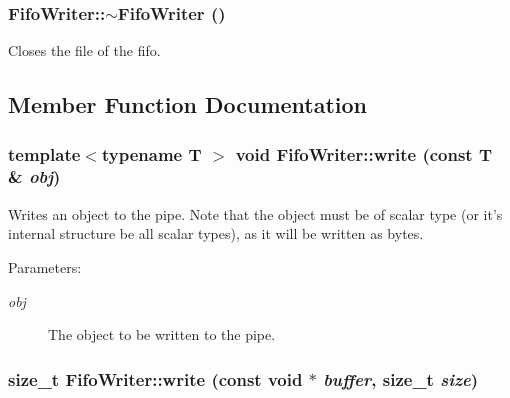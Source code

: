 \hypertarget{classFifoWriter_06e6742e763b0fff527c9144798a6bc7}{
\subsubsection[{$\sim$FifoWriter}]{\setlength{\rightskip}{0pt plus 5cm}FifoWriter::$\sim$FifoWriter ()}}
\label{classFifoWriter_06e6742e763b0fff527c9144798a6bc7}


Closes the file of the fifo. 

\subsection{Member Function Documentation}
\hypertarget{classFifoWriter_401c436c46a9320fa3405f56c2a8094d}{
\subsubsection[{write}]{\setlength{\rightskip}{0pt plus 5cm}template$<$typename T $>$ void FifoWriter::write (const T \& {\em obj})}}
\label{classFifoWriter_401c436c46a9320fa3405f56c2a8094d}


Writes an object to the pipe. Note that the object must be of scalar type (or it's internal structure be all scalar types), as it will be written as bytes.

\begin{Desc}
\item[Parameters:]
\begin{description}
\item[{\em obj}]The object to be written to the pipe. \end{description}
\end{Desc}
\hypertarget{classFifoWriter_31bafc8be7fa9c9ef8c316b9fcf5dbd8}{
\subsubsection[{write}]{\setlength{\rightskip}{0pt plus 5cm}size\_\-t FifoWriter::write (const void $\ast$ {\em buffer}, \/  size\_\-t {\em size})}}
\label{classFifoWriter_31bafc8be7fa9c9ef8c316b9fcf5dbd8}


